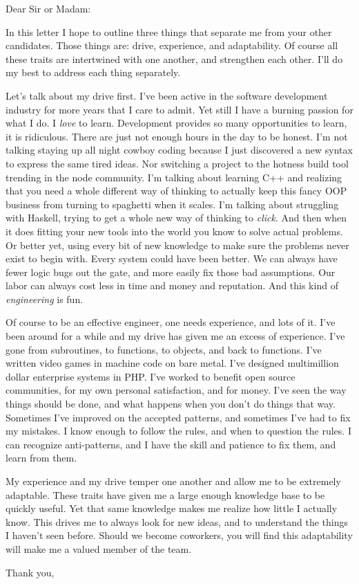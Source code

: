 \documentclass{letter}
\begin{document}
\begin{letter}{}
\opening{Dear Sir or Madam:}

In this letter I hope to outline three things that separate me from your other candidates. Those things are: drive, experience, and adaptability. Of course all these traits are intertwined with one another, and strengthen each other. I'll do my best to address each thing separately.

Let's talk about my drive first. I've been active in the software development industry for more years that I care to admit. Yet still I have a burning passion for what I do. I \emph{love} to learn. Development provides so many opportunities to learn, it is ridiculous. There are just not enough hours in the day to be honest. I'm not talking staying up all night cowboy coding because I just discovered a new syntax to express the same tired ideas. Nor switching a project to the hotness build tool trending in the node community. I'm talking about learning C++ and realizing that you need a whole different way of thinking to actually keep this fancy OOP business from turning to spaghetti when it scales. I'm talking about struggling with Haskell, trying to get a whole new way of thinking to \emph{click}. And then when it does fitting your new tools into the world you know to solve actual problems. Or better yet, using every bit of new knowledge to make sure the problems never exist to begin with. Every system could have been better. We can always have fewer logic bugs out the gate, and more easily fix those bad assumptions. Our labor can always cost less in time and money and reputation. And this kind of \emph{engineering} is fun.

Of course to be an effective engineer, one needs experience, and lots of it. I've been around for a while and my drive has given me an excess of experience. I've gone from subroutines, to functions, to objects, and back to functions. I've written video games in machine code on bare metal. I've designed multimillion dollar enterprise systems in PHP. I've worked to benefit open source communities, for my own personal satisfaction, and for money. I've seen the way things should be done, and what happens when you don't do things that way. Sometimes I've improved on the accepted patterns, and sometimes I've had to fix my mistakes. I know enough to follow the rules, and when to question the rules. I can recognize anti-patterns, and I have the skill and patience to fix them, and learn from them.

My experience and my drive temper one another and allow me to be extremely adaptable. These traits have given me a large enough knowledge base to be quickly useful. Yet that same knowledge makes me realize how little I actually know. This drives me to always look for new ideas, and to understand the things I haven't seen before. Should we become coworkers, you will find this adaptability will make me a valued member of the team.

\closing{Thank you,}
\end{letter}
\end{document}
